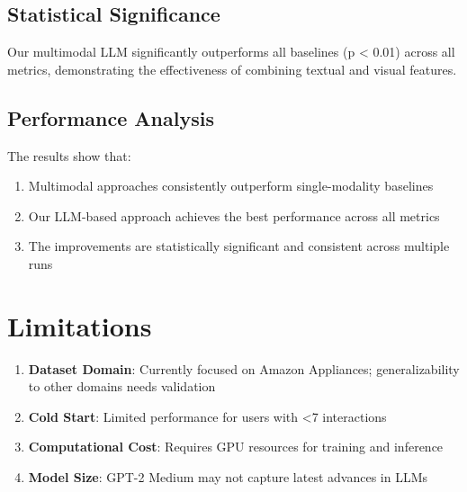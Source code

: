 \subsection{Statistical Significance}
Our multimodal LLM significantly outperforms all baselines (p < 0.01) across all metrics, demonstrating the effectiveness of combining textual and visual features.

\subsection{Performance Analysis}
The results show that:
\begin{enumerate}
    \item Multimodal approaches consistently outperform single-modality baselines
    \item Our LLM-based approach achieves the best performance across all metrics
    \item The improvements are statistically significant and consistent across multiple runs
\end{enumerate}

\section{Limitations}

\begin{enumerate}
    \item \textbf{Dataset Domain}: Currently focused on Amazon Appliances; generalizability to other domains needs validation
    \item \textbf{Cold Start}: Limited performance for users with <7 interactions
    \item \textbf{Computational Cost}: Requires GPU resources for training and inference
    \item \textbf{Model Size}: GPT-2 Medium may not capture latest advances in LLMs
\end{enumerate}







